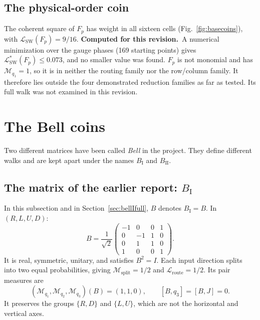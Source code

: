 \documentclass[11pt,a4paper,oneside]{report}
\newcommand{\Id}{I}
\newcommand{\sw}{\mathrm{SW}}
\newcommand{\session}{\textbf{Computed for this revision.}\ }
\numberwithin{equation}{chapter}
\begin{document}
\subsection{The physical-order coin}

The coherent square of \(F_p\) has weight in all sixteen cells
(Fig.~\ref{fig:basecoins}), with \(\mathcal L_{\sw}(F_p)=9/16\).
\session A numerical minimization over the gauge phases (169 starting
points) gives \(\mathcal L^*_{\sw}(F_p)\le0.073\), and no smaller value
was found. \(F_p\) is not monomial and has \(\mathcal M_{q_1}=1\), so it
is in neither the routing family nor the row/column family. It therefore
lies outside the four demonstrated reduction families as far as tested.
Its full walk was not examined in this revision.

\section{The Bell coins}
\label{sec:bellcoin}

Two different matrices have been called \emph{Bell} in the project. They
define different walks and are kept apart under the names
\(B_{\mathrm I}\) and \(B_{\mathrm{II}}\).

\subsection{The matrix of the earlier report: \(B_{\mathrm I}\)}
\label{sec:bellI}

In this subsection and in Section~\ref{sec:bellIfull}, \(B\) denotes
\(B_{\mathrm I}=B\). In \((R,L,U,D)\):
\begin{equation}
\boxed{
B=\frac1{\sqrt2}
\begin{pmatrix}
-1&0&0&1\\
0&-1&1&0\\
0&1&1&0\\
1&0&0&1
\end{pmatrix}.
}
\end{equation}
It is real, symmetric, unitary, and satisfies \(B^2=\Id\).
Each input direction splits into two equal probabilities, giving
\(\mathcal M_{\mathrm{split}}=1/2\) and
\(\mathcal L_{\mathrm{route}}=1/2\). Its pair measures are
\begin{equation}
(\mathcal M_{q_1},\mathcal M_{q_2},\mathcal M_{q_3})(B)=(1,1,0),
\qquad [B,q_3]=[B,J]=0.
\end{equation}
It preserves the groups \(\{R,D\}\) and \(\{L,U\}\), which are
not the horizontal and vertical axes.
\end{document}
